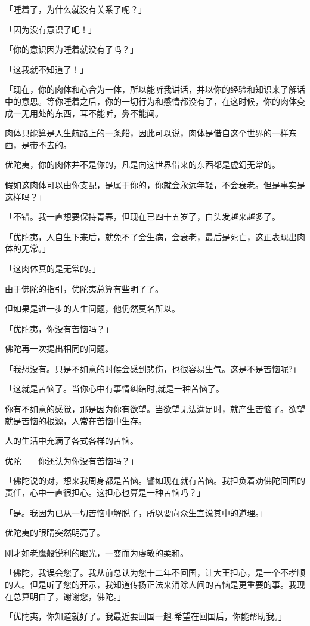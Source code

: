 \documentclass[twoside,openany]{book}
\begin{document}
「睡着了，为什么就没有关系了呢？」

「因为没有意识了吧！」

「你的意识因为睡着就没有了吗？」

「这我就不知道了！」

「现在，你的肉体和心合为一体，所以能听我讲话，并以你的经验和知识来了解话中的意思。等你睡着之后，你的一切行为和感情都没有了，在这时候，你的肉体变成一无用处的东西，耳不能听，鼻不能闻。

肉体只能算是人生航路上的一条船，因此可以说，肉体是借自这个世界的一样东西，是带不去的。

优陀夷，你的肉体并不是你的，凡是向这世界借来的东西都是虚幻无常的。

假如这肉体可以由你支配，是属于你的，你就会永远年轻，不会衰老。但是事实是这样吗？」

「不错。我一直想要保持青春，但现在已四十五岁了，白头发越来越多了。

「优陀夷，人自生下来后，就免不了会生病，会衰老，最后是死亡，这正表现出肉体的无常。」

「这肉体真的是无常的。」

由于佛陀的指引，优陀夷总算有些明了了。

但如果是进一步的人生问题，他仍然莫名所以。

「优陀夷，你没有苦恼吗？」

佛陀再一次提出相同的问题。

「我想没有。只是不如意的时候会感到悲伤，也很容易生气。这是不是苦恼呢?」

「这就是苦恼了。当你心中有事情纠结时,就是一种苦恼了。

你有不如意的感觉，那是因为你有欲望。当欲望无法满足时，就产生苦恼了。欲望就是苦恼的根源，人常在苦恼中生存。

人的生活中充满了各式各样的苦恼。

优陀——你还认为你没有苦恼吗？」

「佛陀说的对，想来我周身都是苦恼。譬如现在就有苦恼。我担负着劝佛陀回国的责任，心中一直很担心。这担心也算是一种苦恼吗？」

「是。我因为已从一切苦恼中解脱了，所以要向众生宣说其中的道理。」

优陀夷的眼睛突然明亮了。

刚才如老鹰般锐利的眼光，一变而为虔敬的柔和。

「佛陀，我误会您了。我从前总认为您十二年不回国，让大王担心，是一个不孝顺的人。但是听了您的开示，我知道传扬正法来消除人间的苦恼是更重要的事。我现在总算明白了，谢谢您，佛陀。」

「优陀夷，你知道就好了。我最近要回国一趟,希望在回国后，你能帮助我。」
\end{document}
